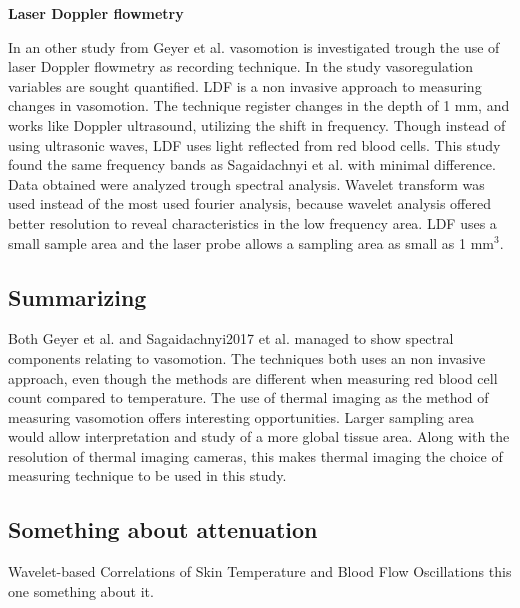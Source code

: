 \textbf{Laser Doppler flowmetry}

In an other study from Geyer et al. vasomotion is investigated trough the use of laser Doppler flowmetry as recording technique. In the study vasoregulation variables are sought quantified. LDF is a non invasive approach to measuring changes in vasomotion. The technique register changes in the depth of 1 mm, and works like Doppler ultrasound, utilizing the shift in frequency. Though instead of using ultrasonic waves, LDF uses light reflected from red blood cells. This study found the same frequency bands as Sagaidachnyi et al. with minimal difference. Data obtained were analyzed trough spectral analysis. Wavelet transform was used instead of the most used fourier analysis, because wavelet analysis offered better resolution to reveal characteristics in the low frequency area.\cite{geyer2004}
LDF uses a small sample area and the laser probe allows a sampling area as small as 1 mm$^3$.\cite{brothers2010} 


  
\subsection{Summarizing}

Both Geyer et al. and Sagaidachnyi2017 et al. managed to show spectral components relating to vasomotion. The techniques both uses an non invasive approach, even though the methods are different when measuring red blood cell count compared to temperature. The use of thermal imaging as the method of measuring vasomotion offers interesting opportunities. Larger sampling area would allow interpretation and study of a more global tissue area. Along with the resolution of thermal imaging cameras, this makes thermal imaging the choice of measuring technique to be used in this study. 

\subsection{Something about attenuation}

Wavelet-based Correlations of Skin Temperature and Blood Flow
Oscillations this one something about it. 
